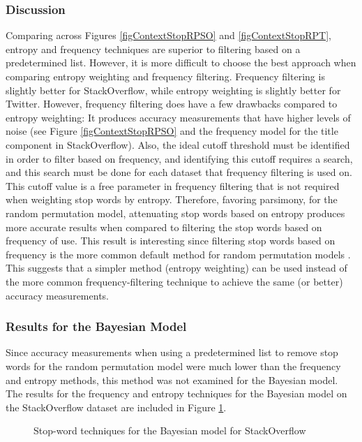 \documentclass[man,floatsintext,donotrepeattitle]{apa6}
\begin{document}
\subsubsection{Discussion}

Comparing across Figures \ref{figContextStopRPSO} and \ref{figContextStopRPT}, entropy and frequency techniques are superior to filtering based on a predetermined list.
However, it is more difficult to choose the best approach when comparing entropy weighting and frequency filtering.
Frequency filtering is slightly better for StackOverflow, while entropy weighting is slightly better for Twitter.
However, frequency filtering does have a few drawbacks compared to entropy weighting:
It produces accuracy measurements that have higher levels of noise (see Figure \ref{figContextStopRPSO} and the frequency model for the title component in StackOverflow).
Also, the ideal cutoff threshold must be identified in order to filter based on frequency,
and identifying this cutoff requires a search, and this search must be done for each dataset that frequency filtering is used on.
This cutoff value is a free parameter in frequency filtering that is not required when weighting stop words by entropy.
Therefore, favoring parsimony, for the random permutation model, attenuating stop words based on entropy produces more accurate results when compared to filtering the stop words based on frequency of use.
This result is interesting since filtering stop words based on frequency is the more common default method for random permutation models \parencite{Sahlgren2008}.
This suggests that a simpler method (entropy weighting) can be used instead of the more common frequency-filtering technique to achieve the same (or better) accuracy measurements.

\subsubsection{Results for the Bayesian Model}

Since accuracy measurements when using a predetermined list to remove stop words for the random permutation model were much lower than the frequency and entropy methods, this method was not examined for the Bayesian model.
The results for the frequency and entropy techniques for the Bayesian model on the StackOverflow dataset are included in Figure \ref{figContextStopBSO}.

\begin{figure}[!htbp]
  \caption{Stop-word techniques for the Bayesian model for StackOverflow}
  \label{figContextStopBSO}
\end{figure}
\end{document}
